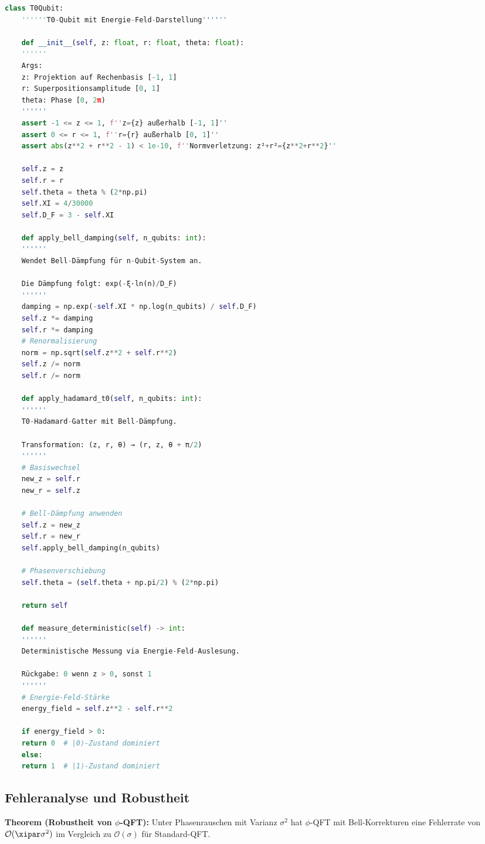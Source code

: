 \begin{lstlisting}[language=Python, caption=Bell-Dämpfungs-Korrektur]
	class T0Qubit:
	''''''T0-Qubit mit Energie-Feld-Darstellung''''''
	
	def __init__(self, z: float, r: float, theta: float):
	''''''
	Args:
	z: Projektion auf Rechenbasis [-1, 1]
	r: Superpositionsamplitude [0, 1]
	theta: Phase [0, 2π)
	''''''
	assert -1 <= z <= 1, f''z={z} außerhalb [-1, 1]''
	assert 0 <= r <= 1, f''r={r} außerhalb [0, 1]''
	assert abs(z**2 + r**2 - 1) < 1e-10, f''Normverletzung: z²+r²={z**2+r**2}''
	
	self.z = z
	self.r = r
	self.theta = theta % (2*np.pi)
	self.XI = 4/30000
	self.D_F = 3 - self.XI
	
	def apply_bell_damping(self, n_qubits: int):
	''''''
	Wendet Bell-Dämpfung für n-Qubit-System an.
	
	Die Dämpfung folgt: exp(-ξ·ln(n)/D_F)
	''''''
	damping = np.exp(-self.XI * np.log(n_qubits) / self.D_F)
	self.z *= damping
	self.r *= damping
	# Renormalisierung
	norm = np.sqrt(self.z**2 + self.r**2)
	self.z /= norm
	self.r /= norm
	
	def apply_hadamard_t0(self, n_qubits: int):
	''''''
	T0-Hadamard-Gatter mit Bell-Dämpfung.
	
	Transformation: (z, r, θ) → (r, z, θ + π/2)
	''''''
	# Basiswechsel
	new_z = self.r
	new_r = self.z
	
	# Bell-Dämpfung anwenden
	self.z = new_z
	self.r = new_r
	self.apply_bell_damping(n_qubits)
	
	# Phasenverschiebung
	self.theta = (self.theta + np.pi/2) % (2*np.pi)
	
	return self
	
	def measure_deterministic(self) -> int:
	''''''
	Deterministische Messung via Energie-Feld-Auslesung.
	
	Rückgabe: 0 wenn z > 0, sonst 1
	''''''
	# Energie-Feld-Stärke
	energy_field = self.z**2 - self.r**2
	
	if energy_field > 0:
	return 0  # |0⟩-Zustand dominiert
	else:
	return 1  # |1⟩-Zustand dominiert
\end{lstlisting}

\subsection{Fehleranalyse und Robustheit}
\label{app:error_analysis}

\textbf{Theorem (Robustheit von $\phi$-QFT):} Unter Phasenrauschen mit Varianz $\sigma^2$ hat $\phi$-QFT mit Bell-Korrekturen eine Fehlerrate von $\mathcal{O}(\xipar \sigma^2)$ im Vergleich zu $\mathcal{O}(\sigma)$ für Standard-QFT.

